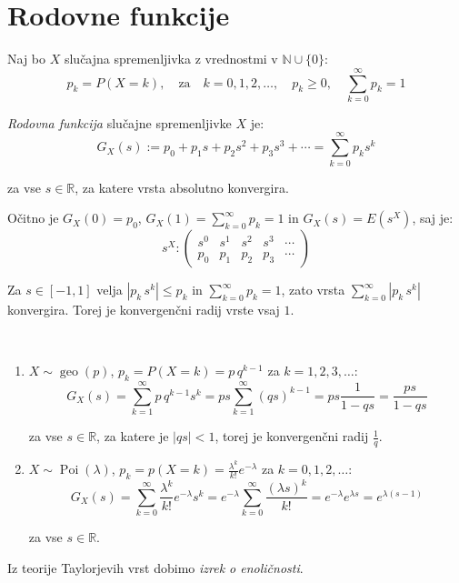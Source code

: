 \documentclass[12pt]{book}
\def\n{\noindent}
\theoremstyle{definition}
\theoremstyle{plain}
\theoremstyle{plain}
\theoremstyle{plain}
\theoremstyle{remark}
\begin{document}
\chapter{Rodovne funkcije}

\n Naj bo $X$ slučajna spremenljivka z vrednostmi v $\mathbb{N} \cup\{0\}$: 
$$
p_k=P(X=k), \quad \text{za} \quad k=0,1,2, \ldots, \quad p_k \geq 0, \quad \sum_{k=0}^{\infty} p_k=1
$$

\n \emph{Rodovna funkcija} slučajne spremenljivke $X$ je:
$$
G_X(s):=p_0+p_1 s+p_2 s^2+p_3 s^3+\cdots=\sum_{k=0}^{\infty} p_k s^k
$$

za vse $s \in \mathbb{R}$, za katere vrsta absolutno konvergira. 

\n Očitno je $G_X(0)=p_0$, $G_X(1)=\sum_{k=0}^{\infty} p_k=1$ in $G_X(s)=E\left( s^X\right)$, saj je: 
$$
s^X:\left(\begin{array}{ccccc}
    s^0 & s^1 & s^2 & s^3 & \cdots \\
    p_0 & p_1 & p_2 & p_3 & \cdots
    \end{array}\right)
$$

\n Za $s \in[-1,1]$ velja $\left|p_k \, s^k\right| \leq p_k$ in $\sum_{k=0}^{\infty} p_k=1$, zato vrsta $\sum_{k=0}^{\infty}\left|p_k \, s^k\right|$ konvergira. Torej je konvergenčni radij vrste vsaj $1$. 

\begin{zgled} ~

    \begin{enumerate}
        \item $X \sim \operatorname{geo}(p)$, $p_k=P(X=k)=p\, q^{k-1}$ za $k=1, 2, 3, \ldots$:
        $$
        G_X(s)=\sum_{k=1}^{\infty} p \, q^{k-1} s^k=p s \sum_{k=1}^{\infty}\left(qs\right)^{k-1} = p s \frac{1}{1-qs} = \frac{p s}{1-q s}
        $$

        za vse $s \in \mathbb{R}$, za katere je $|qs| < 1$, torej je konvergenčni radij $\frac{1}{q}$.
        \item $X \sim \operatorname{Poi}(\lambda)$, $p_k=p(X=k)=\frac{\lambda^k}{k !} e^{-\lambda}$ za $k=0,1,2, \ldots$:
        $$
        G_X(s)=\sum_{k=0}^{\infty} \frac{\lambda^k}{k !} e^{-\lambda} s^k=e^{-\lambda} \sum_{k=0}^{\infty}\frac{(\lambda s)^k}{k !}=e^{-\lambda} e^{\lambda s}=e^{\lambda(s-1)}
        $$

        za vse $s \in \mathbb{R}$.
    \end{enumerate}
\end{zgled}

\n Iz teorije Taylorjevih vrst dobimo \emph{izrek o enoličnosti}. 
\end{document}
